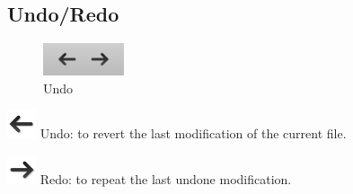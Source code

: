 \documentclass[a4paper,11pt]{report}
\begin{document}
\subsection{Undo/Redo}
\begin{minipage}[h]{4cm}
\begin{figure}[H]
\begin{center}
\includegraphics[scale=0.6]{../pictures/undoredotoolbar.png}
\caption{Undo}
\label{pic:undoredotoolbar}
\end{center}
\end{figure}
\end{minipage}
\begin{minipage}[h]{\textwidth-4cm}
\begin{trivlist}
	\item[] \includegraphics[scale = 0.5]{../../icons/undo.png} Undo: to revert the last modification of the current file.
	\item[] \includegraphics[scale = 0.5]{../../icons/redo.png} Redo: to repeat the last undone modification.
\end{trivlist}
\end{minipage}
\end{document}
